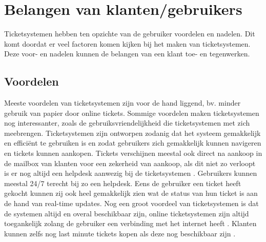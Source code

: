 
\section{Belangen van klanten/gebruikers}
Ticketsystemen hebben ten opzichte van de gebruiker voordelen en nadelen. Dit komt doordat er veel factoren komen kijken bij het maken van ticketsystemen. 
Deze voor- en nadelen kunnen de belangen van een klant toe- en tegenwerken.

\subsection{Voordelen}
Meeste voordelen van ticketsystemen zijn voor de hand liggend, bv. minder gebruik van papier door online tickets. Sommige voordelen maken ticketsystemen nog interessanter, zoals de gebruiksvriendelijkheid die ticketsystemen met zich meebrengen.
Ticketsystemen zijn ontworpen zodanig dat het systeem gemakkelijk en efficiënt te gebruiken is en zodat gebruikers zich gemakkelijk kunnen navigeren en tickets kunnen aankopen.
Tickets verschijnen meestal ook direct na aankoop in de mailbox van klanten voor een zekerheid van aankoop, als dit niet zo verloopt is er nog altijd een helpdesk aanwezig bij de ticketsystemen \cite{cm-voordelen}. 
Gebruikers kunnen meestal 24/7 terecht bij zo een helpdesk. Eens de gebruiker een ticket heeft gekocht kunnen zij ook heel gemakkelijk zien wat de status van hun ticket is aan de hand van real-time updates.
Nog een groot voordeel van ticketsystemen is dat de systemen altijd en overal beschikbaar zijn, online ticketsystemen zijn altijd toegankelijk zolang de gebruiker een verbinding met het internet heeft \cite{Benefitsonline2023}.
Klanten kunnen zelfs nog last minute tickets kopen als deze nog beschikbaar zijn \cite{cm-voordelen}.


